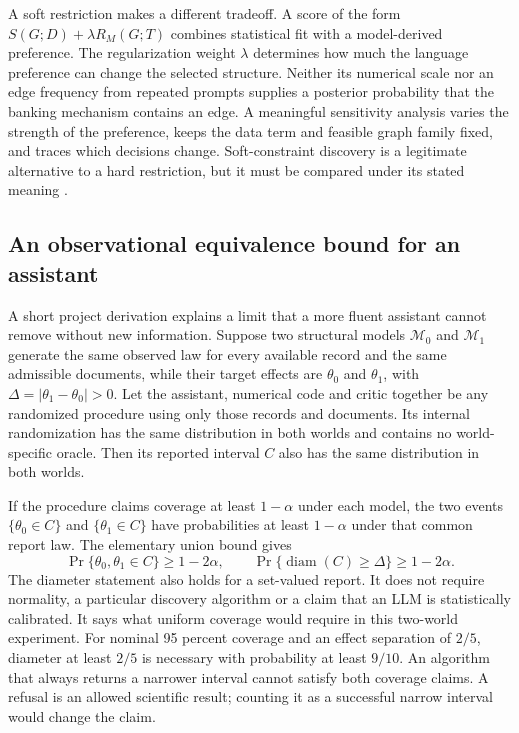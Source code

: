 A soft restriction makes a different tradeoff. A score of the form
$S(G;D)+\lambda R_M(G;T)$ combines statistical fit with a model-derived
preference. The regularization weight $\lambda$ determines how much the
language preference can change the selected structure. Neither its numerical
scale nor an edge frequency from repeated prompts supplies a posterior
probability that the banking mechanism contains an edge. A meaningful
sensitivity analysis varies the strength of the preference, keeps the data
term and feasible graph family fixed, and traces which decisions change.
Soft-constraint discovery is a legitimate alternative to a hard restriction,
but it must be compared under its stated meaning
\citep{v12_la_2405_13551,v12_la_2407_15073}.

\subsection{An observational equivalence bound for an assistant}

A short project derivation explains a limit that a more fluent assistant cannot
remove without new information. Suppose two structural models $\mathcal M_0$
and $\mathcal M_1$ generate the same observed law for every available record and
the same admissible documents, while their target effects are $\theta_0$ and
$\theta_1$, with $\Delta=|\theta_1-\theta_0|>0$. Let the assistant, numerical
code and critic together be any randomized procedure using only those records
and documents. Its internal randomization has the same distribution in both
worlds and contains no world-specific oracle. Then its reported interval $C$
also has the same distribution in both worlds.

If the procedure claims coverage at least $1-\alpha$ under each model, the two
events $\{\theta_0\in C\}$ and $\{\theta_1\in C\}$ have probabilities at least
$1-\alpha$ under that common report law. The elementary union bound gives
\begin{equation}
 \Pr\{\theta_0,\theta_1\in C\}\geq 1-2\alpha,
 \qquad
 \Pr\{\operatorname{diam}(C)\geq\Delta\}\geq1-2\alpha.
 \label{exec14:language-information-bound}
\end{equation}
The diameter statement also holds for a set-valued report. It does not require
normality, a particular discovery algorithm or a claim that an LLM is
statistically calibrated. It says what uniform coverage would require in this
two-world experiment. For nominal 95 percent coverage and an effect separation
of $2/5$, diameter at least $2/5$ is necessary with probability at least $9/10$.
An algorithm that always returns a narrower interval cannot satisfy both
coverage claims. A refusal is an allowed scientific result; counting it as a
successful narrow interval would change the claim.


